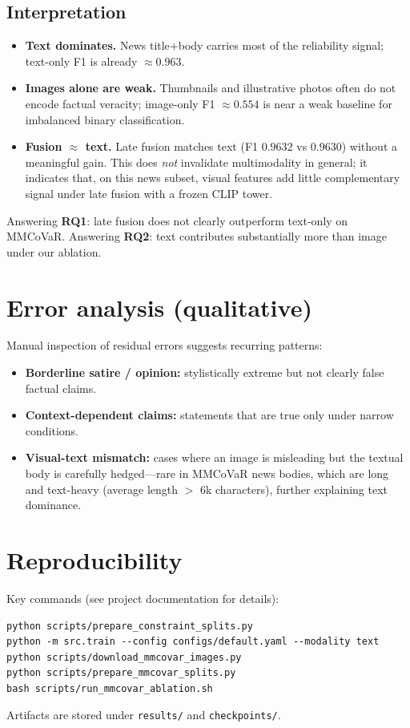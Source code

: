 \subsection{Interpretation}
\begin{itemize}
  \item \textbf{Text dominates.} News title+body carries most of the reliability signal; text-only F1 is already $\approx 0.963$.
  \item \textbf{Images alone are weak.} Thumbnails and illustrative photos often do not encode factual veracity; image-only F1 $\approx 0.554$ is near a weak baseline for imbalanced binary classification.
  \item \textbf{Fusion $\approx$ text.} Late fusion matches text (F1 $0.9632$ vs $0.9630$) without a meaningful gain.
  This does \emph{not} invalidate multimodality in general; it indicates that, on this news subset, visual features add little complementary signal under late fusion with a frozen CLIP tower.
\end{itemize}

Answering \textbf{RQ1}: late fusion does not clearly outperform text-only on MMCoVaR.
Answering \textbf{RQ2}: text contributes substantially more than image under our ablation.

\section{Error analysis (qualitative)}

Manual inspection of residual errors suggests recurring patterns:
\begin{itemize}
  \item \textbf{Borderline satire / opinion:} stylistically extreme but not clearly false factual claims.
  \item \textbf{Context-dependent claims:} statements that are true only under narrow conditions.
  \item \textbf{Visual-text mismatch:} cases where an image is misleading but the textual body is carefully hedged---rare in MMCoVaR news bodies, which are long and text-heavy (average length $>$ 6k characters), further explaining text dominance.
\end{itemize}

\section{Reproducibility}

Key commands (see project documentation for details):
\begin{verbatim}
python scripts/prepare_constraint_splits.py
python -m src.train --config configs/default.yaml --modality text
python scripts/download_mmcovar_images.py
python scripts/prepare_mmcovar_splits.py
bash scripts/run_mmcovar_ablation.sh
\end{verbatim}
Artifacts are stored under \texttt{results/} and \texttt{checkpoints/}.
